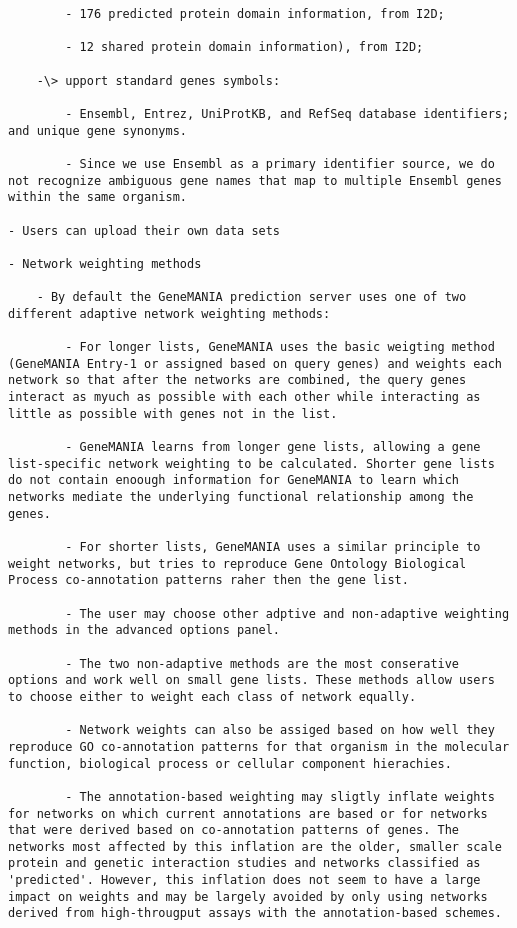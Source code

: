 \documentclass[
]{book}
\begin{document}
\begin{verbatim}
        - 176 predicted protein domain information, from I2D;

        - 12 shared protein domain information), from I2D;

    -\> upport standard genes symbols:

        - Ensembl, Entrez, UniProtKB, and RefSeq database identifiers; and unique gene synonyms.

        - Since we use Ensembl as a primary identifier source, we do not recognize ambiguous gene names that map to multiple Ensembl genes within the same organism.

- Users can upload their own data sets

- Network weighting methods

    - By default the GeneMANIA prediction server uses one of two different adaptive network weighting methods:

        - For longer lists, GeneMANIA uses the basic weigting method (GeneMANIA Entry-1 or assigned based on query genes) and weights each network so that after the networks are combined, the query genes interact as myuch as possible with each other while interacting as little as possible with genes not in the list.

        - GeneMANIA learns from longer gene lists, allowing a gene list-specific network weighting to be calculated. Shorter gene lists do not contain enoough information for GeneMANIA to learn which networks mediate the underlying functional relationship among the genes.

        - For shorter lists, GeneMANIA uses a similar principle to weight networks, but tries to reproduce Gene Ontology Biological Process co-annotation patterns raher then the gene list.

        - The user may choose other adptive and non-adaptive weighting methods in the advanced options panel.

        - The two non-adaptive methods are the most conserative options and work well on small gene lists. These methods allow users to choose either to weight each class of network equally.

        - Network weights can also be assiged based on how well they reproduce GO co-annotation patterns for that organism in the molecular function, biological process or cellular component hierachies.

        - The annotation-based weighting may sligtly inflate weights for networks on which current annotations are based or for networks that were derived based on co-annotation patterns of genes. The networks most affected by this inflation are the older, smaller scale protein and genetic interaction studies and networks classified as 'predicted'. However, this inflation does not seem to have a large impact on weights and may be largely avoided by only using networks derived from high-througput assays with the annotation-based schemes.


\end{verbatim}
\end{document}
